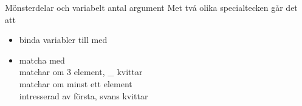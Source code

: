 \begin{Slide}{Mönsterdelar och variabelt antal argument}\SlideFontSmall
Met två olika specialtecken går det att
\begin{itemize}
\item binda variabler till  med  \\

\item matcha   med \code{*}  
\\   matchar om 3 element, \_ kvittar
\\ \ifswedish{}\else{}\fi{}  matchar om minst ett element
\\   intresserad av första, svans kvittar
\end{itemize}
\end{Slide}


